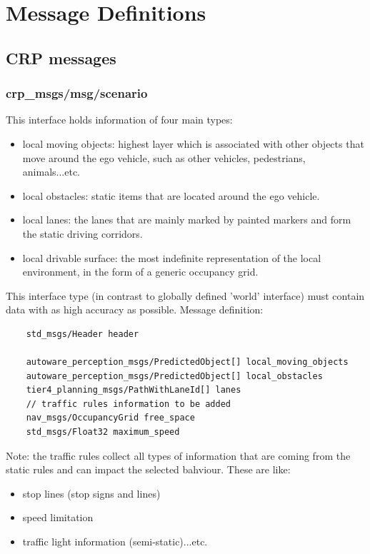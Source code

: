 \documentclass[sn-mathphys-num]{sn-jnl}%
\begin{document}
\section{Message Definitions} \label{message_definitions}
\subsection{CRP messages}
\subsubsection{crp\_msgs/msg/scenario}
This interface holds information of four main types:
\begin{itemize}
    \item local moving objects: highest layer which is associated with other objects that move around the ego vehicle, such as other vehicles, pedestrians, animals...etc.
    \item local obstacles: static items that are located around the ego vehicle. 
    \item local lanes: the lanes that are mainly marked by painted markers and form the static driving corridors. 
    \item local drivable surface: the most indefinite representation of the local environment, in the form of a generic occupancy grid.
\end{itemize}
This interface type (in contrast to globally defined 'world' interface) must contain data with as high accuracy as possible.
Message definition:
\begin{lstlisting}
    std_msgs/Header header

    autoware_perception_msgs/PredictedObject[] local_moving_objects
    autoware_perception_msgs/PredictedObject[] local_obstacles
    tier4_planning_msgs/PathWithLaneId[] lanes
    // traffic rules information to be added
    nav_msgs/OccupancyGrid free_space
    std_msgs/Float32 maximum_speed
\end{lstlisting}
Note: the traffic rules collect all types of information that are coming from the static rules and can impact the selected bahviour. These are like:
\begin{itemize}
    \item stop lines (stop signs and lines)
    \item speed limitation
    \item traffic light information (semi-static)...etc.
\end{itemize}
\end{document}
